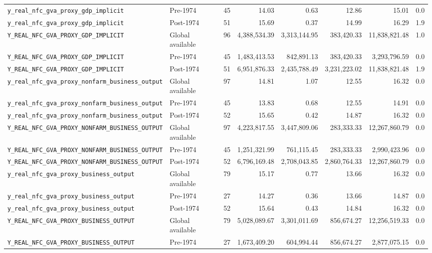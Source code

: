 \begin{landscape}
\begin{longtable}{p{4.4cm}p{3.8cm}rrrrrr}
\\
\nolinkurl{y_real_nfc_gva_proxy_gdp_implicit} & Pre-1974 & 45 & 14.03 & 0.63 & 12.86 & 15.01 & 0.0
\\
\nolinkurl{y_real_nfc_gva_proxy_gdp_implicit} & Post-1974 & 51 & 15.69 & 0.37 & 14.99 & 16.29 & 1.9
\\
\nolinkurl{Y_REAL_NFC_GVA_PROXY_GDP_IMPLICIT} & Global available & 96 & 4,388,534.39 & 3,313,144.95 & 383,420.33 & 11,838,821.48 & 1.0
\\
\nolinkurl{Y_REAL_NFC_GVA_PROXY_GDP_IMPLICIT} & Pre-1974 & 45 & 1,483,413.53 & 842,891.13 & 383,420.33 & 3,293,796.59 & 0.0
\\
\nolinkurl{Y_REAL_NFC_GVA_PROXY_GDP_IMPLICIT} & Post-1974 & 51 & 6,951,876.33 & 2,435,788.49 & 3,231,223.02 & 11,838,821.48 & 1.9
\\
\nolinkurl{y_real_nfc_gva_proxy_nonfarm_business_output} & Global available & 97 & 14.81 & 1.07 & 12.55 & 16.32 & 0.0
\\
\nolinkurl{y_real_nfc_gva_proxy_nonfarm_business_output} & Pre-1974 & 45 & 13.83 & 0.68 & 12.55 & 14.91 & 0.0
\\
\nolinkurl{y_real_nfc_gva_proxy_nonfarm_business_output} & Post-1974 & 52 & 15.65 & 0.42 & 14.87 & 16.32 & 0.0
\\
\nolinkurl{Y_REAL_NFC_GVA_PROXY_NONFARM_BUSINESS_OUTPUT} & Global available & 97 & 4,223,817.55 & 3,447,809.06 & 283,333.33 & 12,267,860.79 & 0.0
\\
\nolinkurl{Y_REAL_NFC_GVA_PROXY_NONFARM_BUSINESS_OUTPUT} & Pre-1974 & 45 & 1,251,321.99 & 761,115.45 & 283,333.33 & 2,990,423.96 & 0.0
\\
\nolinkurl{Y_REAL_NFC_GVA_PROXY_NONFARM_BUSINESS_OUTPUT} & Post-1974 & 52 & 6,796,169.48 & 2,708,043.85 & 2,860,764.33 & 12,267,860.79 & 0.0
\\
\nolinkurl{y_real_nfc_gva_proxy_business_output} & Global available & 79 & 15.17 & 0.77 & 13.66 & 16.32 & 0.0
\\
\nolinkurl{y_real_nfc_gva_proxy_business_output} & Pre-1974 & 27 & 14.27 & 0.36 & 13.66 & 14.87 & 0.0
\\
\nolinkurl{y_real_nfc_gva_proxy_business_output} & Post-1974 & 52 & 15.64 & 0.43 & 14.84 & 16.32 & 0.0
\\
\nolinkurl{Y_REAL_NFC_GVA_PROXY_BUSINESS_OUTPUT} & Global available & 79 & 5,028,089.67 & 3,301,011.69 & 856,674.27 & 12,256,519.33 & 0.0
\\
\nolinkurl{Y_REAL_NFC_GVA_PROXY_BUSINESS_OUTPUT} & Pre-1974 & 27 & 1,673,409.20 & 604,994.44 & 856,674.27 & 2,877,075.15 & 0.0

\end{longtable}
\end{landscape}
